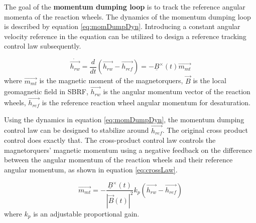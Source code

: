 The goal of the \textbf{momentum dumping loop} is to track the reference angular momenta of the reaction wheels. The dynamics of the momentum dumping loop is described by equation \ref{eq:momDumpDyn}. Introducing a constant angular velocity reference in the equation can be utilized to design a reference tracking control law subsequently.

\begin{equation}
\label{eq:momDumpDyn}
\dot{\vec{h_{rw}}} = \frac{d}{dt}(\vec{h_{rw}} - \vec{h_{ref}}) = -\underline{B}^\times(t) \vec{m_{mt}} 
\end{equation}
where $\vec{m_{mt}}$ is the magnetic moment of the magnetorquers, $\vec{B}$ is the local geomagnetic field in SBRF, $\vec{h_{rw}}$ is the angular momentum vector of the reaction wheels, $\vec{h_{ref}}$ is the reference reaction wheel angular momentum for desaturation.


Using the dynamics in equation \ref{eq:momDumpDyn}, the momentum dumping control law can be designed to stabilize around $\vec{h_{ref}}$. The original cross product control does exactly that.
The cross-product control law controls the magnetorquers' magnetic momentum using a negative feedback on the difference between the angular momentum of the reaction wheels and their reference angular momentum, as shown in equation \ref{eq:crossLaw}.

\begin{equation}
\label{eq:crossLaw}
\vec{m_{mt}} = -\frac{\underline{B}^\times(t)}{|\vec{B}(t) |^2} k_p\left(\vec{h_{rw}} - \vec{h_{ref}} \right)
\end{equation}
where $k_p$ is an adjustable proportional gain.

		
